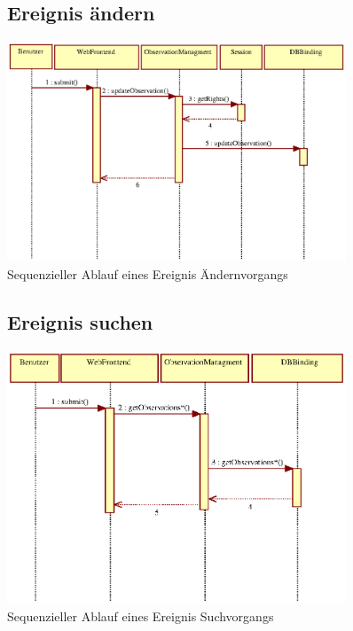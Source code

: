 \documentclass[a4paper,11pt]{scrartcl}
\begin{document}
\begin{figure}[h]
\subsection{Ereignis ändern}
		\centering
		\includegraphics[width=0.90\textwidth]{images/seq11_EreignisAendern.eps}
		\caption{Sequenzieller Ablauf eines Ereignis Ändernvorgangs}
		\label{seq11}
\end{figure}



\begin{figure}[h]
\subsection{Ereignis suchen}
		\centering
		\includegraphics[width=0.90\textwidth]{images/seq12_EreignisSuchen.eps}
		\caption{Sequenzieller Ablauf eines Ereignis Suchvorgangs}
		\label{seq12}
\end{figure}
\end{document}
